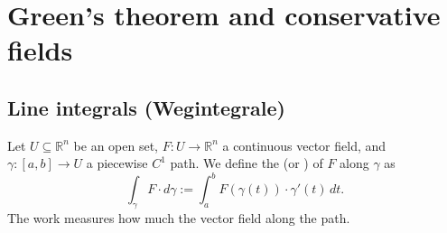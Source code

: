 
\section{Green's theorem and conservative fields}
\label{sec:greens_theorem_conservative_fields}


\subsection{Line integrals (Wegintegrale)}

\begin{definition}
\label{def:line_integral}
Let $U \subseteq \mathbb{R}^n$ be an open set, $F : U \to \mathbb{R}^n$ a continuous vector field, and $\gamma : [a,b] \to U$ a piecewise $C^1$ path. We define the  (or ) of $F$ along $\gamma$ as
\[\int_\gamma F \cdot d\gamma := \int_a^b F(\gamma(t)) \cdot \gamma'(t) \,dt.\]
The work measures how much the vector field  along the path.
\end{definition}

